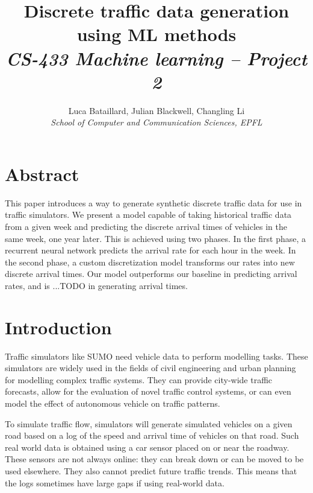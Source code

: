 \documentclass[10pt,conference,compsocconf]{IEEEtran}
\begin{document}
\title{%
    Discrete traffic data generation using ML methods \\
    \large \textit{CS-433 Machine learning -- Project 2}
}

\author{
  Luca Bataillard, Julian Blackwell, Changling Li\\
  \textit{School of Computer and Communication Sciences, EPFL}
}

\maketitle



\section*{Abstract}

This paper introduces a way to generate synthetic discrete traffic data for use in traffic
simulators. We present a model capable of taking historical traffic data from a given week and
predicting the discrete arrival times of vehicles in the same week, one year later. This is achieved 
using two phases. In the first phase, a recurrent neural network predicts the arrival rate for each 
hour in the week. In the second phase, a custom discretization model transforms our rates into new 
discrete arrival times. Our model outperforms our baseline in predicting arrival rates, and is 
...TODO in generating arrival times.



\section{Introduction}

Traffic simulators like SUMO \cite{SUMO2018} need vehicle data to perform modelling tasks. These
simulators are widely used in the fields of civil engineering and urban planning for modelling complex
traffic systems. They can provide city-wide traffic forecasts, allow for the evaluation of novel
traffic control systems, or can even model the effect of autonomous vehicle on traffic patterns. 

To simulate traffic flow, simulators will generate simulated vehicles on a given road based on a 
log of the speed and arrival time of vehicles on that road. Such real world data is obtained using 
a car sensor placed on or near the roadway. These sensors are not always online: they can break 
down or can be moved to be used elsewhere. They also cannot predict future traffic trends. This 
means that the logs sometimes have large gaps if using real-world data.
\end{document}
